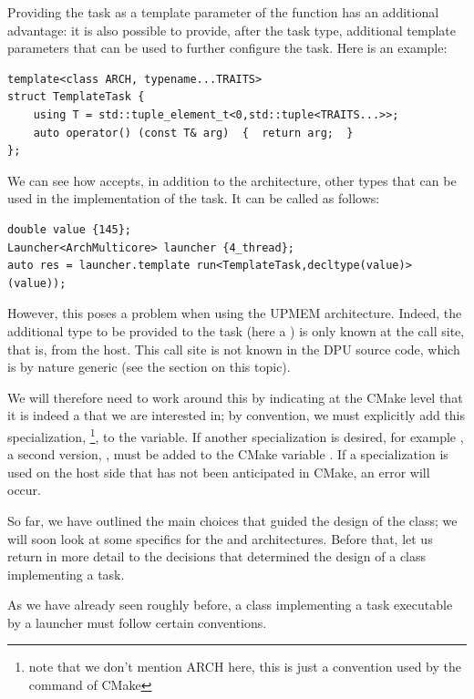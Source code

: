Providing the task as a template parameter of the  function has an additional advantage: it is also possible to provide, 
after the task type, additional template parameters that can be used to further configure the task. Here is an example:
\begin{verbatim}
template<class ARCH, typename...TRAITS>
struct TemplateTask {
    using T = std::tuple_element_t<0,std::tuple<TRAITS...>>;
    auto operator() (const T& arg)  {  return arg;  }
};
\end{verbatim}
We can see how  accepts, in addition to the architecture, other types that can be used in the
 implementation of the task. It can be called as follows:
\begin{verbatim}
double value {145};
Launcher<ArchMulticore> launcher {4_thread};
auto res = launcher.template run<TemplateTask,decltype(value)> (value));
\end{verbatim}
However, this poses a problem when using the UPMEM architecture. Indeed, the additional type to be provided 
to the task (here a ) is only known at the call site, that is, from the host. This call site is not
 known in the DPU source code, which is by nature generic (see the section on this topic).

We will therefore need to work around this by indicating at the CMake level that it is indeed a
   that we are interested in; 
 by convention, we must explicitly add this specialization, 
 \footnote{note
that we don't mention ARCH here, this is just a convention used by the  command of CMake},
 to the  variable. 
 If another specialization is desired, for example  , a second version, 
 , 
 must be added to the CMake variable . If a specialization is used on the host side that has not
  been anticipated in CMake, an error will occur.

So far, we have outlined the main choices that guided the design of the  class; 
we will soon look at some specifics for the  and  architectures. 
Before that, let us return in more detail to the decisions that determined the design of a class implementing a task.

As we have already seen roughly before, a class implementing a task executable by a launcher must follow certain conventions.

